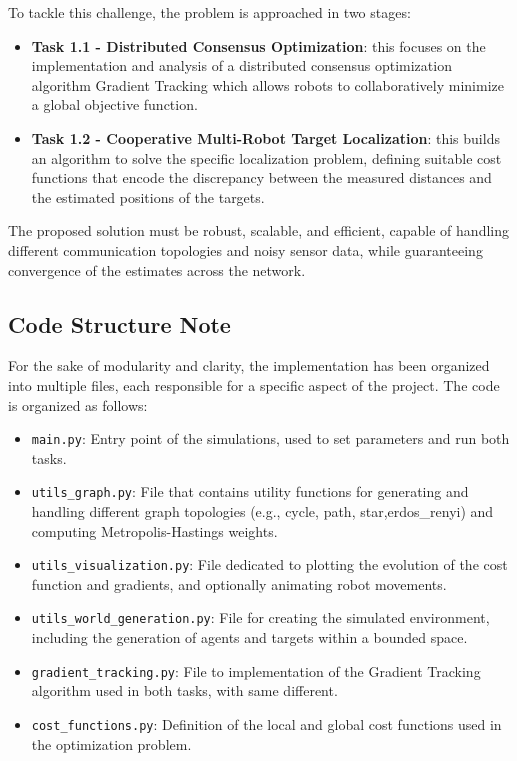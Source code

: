 To tackle this challenge, the problem is approached in two stages:
\begin{itemize}
    \item \textbf{Task 1.1 - Distributed Consensus Optimization}: this focuses on the implementation and analysis of a distributed consensus optimization algorithm 
    Gradient Tracking which allows robots to collaboratively minimize a global objective function.
    \item \textbf{Task 1.2 - Cooperative Multi-Robot Target Localization}: this builds an algorithm to solve the specific localization problem, defining suitable 
    cost functions that encode the discrepancy between the measured distances and the estimated positions of the targets.
\end{itemize}

The proposed solution must be robust, scalable, and efficient, capable of handling different communication topologies and noisy sensor data, while 
guaranteeing convergence of the estimates across the network.

\subsection*{Code Structure Note}

For the sake of modularity and clarity, the implementation has been organized into multiple files, each responsible for a specific aspect of the project. 
The code is organized as follows:

\begin{itemize}
    \item \texttt{main.py}: Entry point of the simulations, used to set parameters and run both tasks.
    \item \texttt{utils\_graph.py}: File that contains utility functions for generating and handling different graph topologies (e.g., cycle, path, star,erdos\_renyi) 
    and computing Metropolis-Hastings weights.
    \item \texttt{utils\_visualization.py}: File dedicated to plotting the evolution of the cost function and gradients, and optionally animating robot movements.
    \item \texttt{utils\_world\_generation.py}: File for creating the simulated environment, including the generation of agents and targets within a bounded space.
    \item \texttt{gradient\_tracking.py}: File to implementation of the Gradient Tracking algorithm used in both tasks, with same different.
    \item \texttt{cost\_functions.py}: Definition of the local and global cost functions used in the optimization problem.
\end{itemize}

